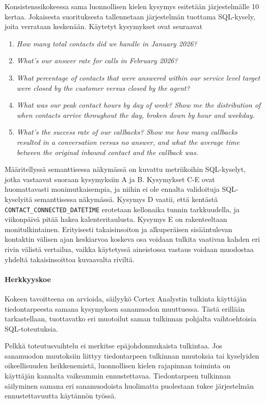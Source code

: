 Konsistenssikokeessa sama luonnollisen kielen kysymys esitetään järjestelmälle 10 kertaa. Jokaisesta suorituksesta tallennetaan järjestelmän tuottama SQL-kysely, joita verrataan keskenään. Käytetyt kysymykset ovat seuraavat
\begin{enumerate}[label=\Alph*.]
    \label{it:q_consistency}
  \item \textit{How many total contacts did we handle in January 2026?}
  \item \textit{What's our answer rate for calls in February 2026?}
  \item \textit{What percentage of contacts that were answered within our service level target were closed by the customer versus closed by the agent?}
  \item \textit{What was our peak contact hours by day of week? Show me the distribution of when contacts arrive throughout the day, broken down by hour and weekday.}
  \item \textit{What's the success rate of our callbacks? Show me how many callbacks resulted in a conversation versus no answer, and what the average time between the original inbound contact and the callback was.}
\end{enumerate}

Määritellyssä semanttisessa näkymässä on kuvattu metriikoihin SQL-kyselyt, jotka vastaavat suoraan kysymyksiin A ja B. Kysymykset C-E ovat huomattavasti monimutkaisempia, ja niihin ei ole ennalta validoituja SQL-kyselyitä semanttisessa näkymässä. Kysymys D vaatii, että kentästä \texttt{CONTACT\_CONNECTED\_DATETIME} erotetaan kellonaika tunnin tarkkuudella, ja viikonpäivä pitää hakea kalenteritaulusta. Kysymys E on rakenteeltaan monitulkintainen. Erityisesti takaisinsoiton ja alkuperäisen sisääntulevan kontaktin välisen ajan keskiarvoa koskeva osa voidaan tulkita vaativan kahden eri rivin välistä vertailua, vaikka käytetyssä aineistossa vastaus voidaan muodostaa yhdeltä takaisinsoittoa kuvaavalta riviltä.

\paragraph{Herkkyyskoe}
Kokeen tavoitteena on arvioida, säilyykö Cortex Analystin tulkinta
käyttäjän tiedontarpeesta samana kysymyksen sanamuodon muuttuessa.
Tästä erillään tarkastellaan, tuottavatko eri muotoilut saman tulkinnan
pohjalta vaihtoehtoisia SQL-toteutuksia.

Pelkkä toteutusvaihtelu ei
merkitse epäjohdonmukaista tulkintaa. Jos sanamuodon muutoksiin liittyy
tiedontarpeen tulkinnan muutoksia tai kyselyiden oikeellisuuden
heikkenemistä, luonnollisen kielen rajapinnan toiminta on käyttäjän
kannalta vaikeammin ennustettavaa. Tiedontarpeen tulkinnan säilyminen
samana eri sanamuodoista huolimatta puolestaan tukee järjestelmän
ennustettavuutta käytännön työssä.

